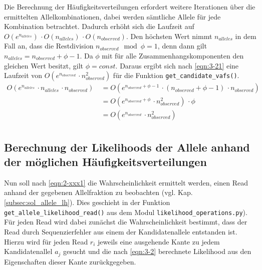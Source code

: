 Die Berechnung der Häufigkeitsverteilungen erfordert weitere Iterationen über die ermittelten Allelkombinationen, dabei werden sämtliche Allele für jede Kombination betrachtet. Dadurch erhöht sich die Laufzeit auf $ O(e^{n_{alleles}})\, \cdotp O(n_{alleles}) \, \cdotp O(n_{observed}) $. Den höchsten Wert nimmt $ n_{alleles} $ in dem Fall an, dass die Restdivision $ n_{observed} \mod \phi = 1 $, denn dann gilt  $ n_{alleles} = n_{observed} + \phi - 1 $. Da $\phi$ mit für alle Zusammenhangskomponenten den gleichen Wert besitzt, gilt $\phi = const$. Daraus ergibt sich nach \eqref{eqn:3-21} eine Laufzeit von $ O(e^{n_{observed}}\, \cdotp n_{observed}^2) $ für die Funktion  \lstinline|get_candidate_vafs()|.
\begin{equation} \label{eqn:3-21}
\tag{3-21}
\begin{aligned}
O(e^{n_{alleles}} \, \cdotp n_{alleles} \, \cdotp n_{observed}) 
&\ {}= O(e^{n_{observed} + \phi - 1} \, \cdotp (n_{observed} + \phi - 1) \, \cdotp n_{observed})\\
&\ = O(e^{n_{observed} + \phi}\, \cdotp n_{observed}^2) \, \cdotp \phi\\
&\ = O(e^{n_{observed}}\, \cdotp n_{observed}^2)\\
\end{aligned}
\end{equation} 

\subsection{Berechnung der Likelihoods der Allele anhand der möglichen Häufigkeitsverteilungen} \label{subsec:lh_allele}

Nun soll nach \eqref{eqn:2-xxx1} die Wahrscheinlichkeit ermittelt werden, einen Read anhand der gegebenen Allelfraktion zu beobachten (vgl. Kap. \ref{subsec:sol_allele_lh}). Dies geschieht in der Funktion \lstinline|get_allele_likelihood_read()| aus dem Modul \lstinline|likelihood_operations.py|). Für jeden Read wird dabei zunächst die Wahrscheinlichkeit bestimmt, dass der Read durch Sequenzierfehler aus einem der Kandidatenallele entstanden ist. Hierzu wird für jeden Read $ r_{i} $ jeweils eine ausgehende Kante zu jedem Kandidatenallel $ a_{j} $ gesucht und die nach \eqref{eqn:3-2} berechnete Likelihood aus den Eigenschaften dieser Kante zurückgegeben.\\

